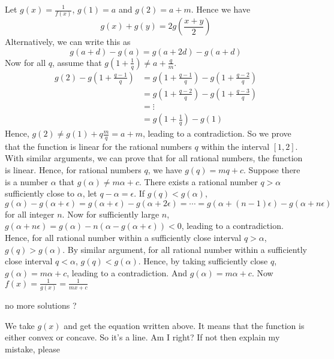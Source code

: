 \begin{solution}
	Let $ g(x)=\frac{1}{f(x)}$, $ g(1)=a$ and $ g(2)=a+m$.
Hence we have
\[ g(x)+g(y)=2g(\frac{x+y}{2})\]
Alternatively, we can write this as
\[ g(a+d)-g(a)=g(a+2d)-g(a+d)\]
Now for all $ q$, assume that $ g(1+\frac{1}{q})\ne a+\frac{q}{m}$.
\begin{align*}g(2)-g(1+\frac{q-1}{q})&=g(1+\frac{q-1}{q})-g(1+\frac{q-2}{q})\\&=g(1+\frac{q-2}{q})-g(1+\frac{q-3}{q})\\&=\vdots\\&=g(1+\frac{1}{q})-g(1)\end{align*}
Hence, $ g(2)\ne g(1)+q\frac{m}{q}=a+m$, leading to a contradiction. So we prove that the function is linear for the rational numbers $ q$ within the interval $ [1,2]$. With similar arguments, we can prove that for all rational numbers, the function is linear. Hence, for rational numbers $ q$, we have $ g(q)=mq+c$.
Suppose there is a number $ \alpha$ that $ g(\alpha)\ne m\alpha+c$. There exists a rational number $ q>\alpha$ sufficiently close to $ \alpha$, let $ q-\alpha=\epsilon$. If $ g(q)<g(\alpha)$, $ g(\alpha)-g(\alpha+\epsilon)=g(\alpha+\epsilon)-g(\alpha+2\epsilon)=\cdots=g(\alpha+(n-1)\epsilon)-g(\alpha+n\epsilon)$ for all integer $ n$. Now for sufficiently large $ n$, $ g(\alpha+n\epsilon)=g(\alpha)-n(\alpha-g(\alpha+\epsilon))<0$, leading to a contradiction. Hence, for all rational number within a sufficiently close interval $ q>\alpha$, $ g(q)>g(\alpha)$. By similar argument, for all rational number within a sufficiently close interval $ q<\alpha$, $ g(q)<g(\alpha)$. Hence, by taking sufficiently close $ q$, $ g(\alpha)=m\alpha+c$, leading to a contradiction. And $ g(\alpha)=m\alpha+c$.
Now $ f(x)=\frac{1}{g(x)}=\frac{1}{mx+c}$
\end{solution}



\begin{solution}
	no more solutions ?
\end{solution}



\begin{solution}
	We take $g(x)$ and get the equation written above. It means that the function is either convex or concave. So it's a line. Am I right? If not then explain my mistake, please
\end{solution}



